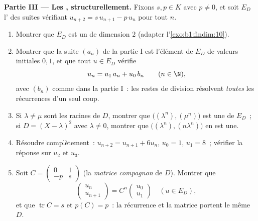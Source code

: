 \begin{problem}
\medskip
\noindent\textbf{Partie III --- Les , structurellement.}
Fixons $s, p \in K$ avec $p \neq 0$, et soit $E_D$ l' des
suites vérifiant $u_{n+2} = s\,u_{n+1} - p\,u_n$ pour tout $n$.
\begin{enumerate}[resume]
  \item Montrer que $E_D$ est un  de dimension $2$
        (adapter l'\cref{exo:b1:findim:10}).
  \item Montrer que la suite $(a_n)$ de la partie I est l'élément
        de $E_D$ de valeurs initiales $0, 1$, et que tout $u
        \in E_D$ vérifie
        \[
        u_n = u_1\,a_n + u_0\,b_n \qquad (n \in \N),
        \]
        avec $(b_n)$ comme dans la partie I~: les restes de division
        résolvent \emph{toutes} les récurrences d'un seul coup.
  \item Si $\lambda \neq \mu$ sont les racines de $D$, montrer que
        $\bigl((\lambda^n), (\mu^n)\bigr)$ est une  de $E_D$~;
        si $D = (X-\lambda)^2$ avec $\lambda \neq 0$, montrer que
        $\bigl((\lambda^n), (n\lambda^n)\bigr)$ en est une.
  \item Résoudre complètement~: $u_{n+2} = u_{n+1} + 6u_n$, $u_0 = 1$,
        $u_1 = 8$~; vérifier la réponse sur $u_2$ et $u_3$.
  \item Soit $C = \begin{pmatrix} 0 & 1\\ -p & s\end{pmatrix}$
        (la \emph{matrice compagnon} de $D$). Montrer que
        \[
        \begin{pmatrix} u_{n}\\ u_{n+1}\end{pmatrix}
        = C^n \begin{pmatrix} u_0\\ u_1\end{pmatrix}
        \quad (u \in E_D),
        \]
        et que $\operatorname{tr} C = s$ et $p(C) = p$~: la
        récurrence et la matrice portent le même  $D$.
\end{enumerate}


\end{problem}
